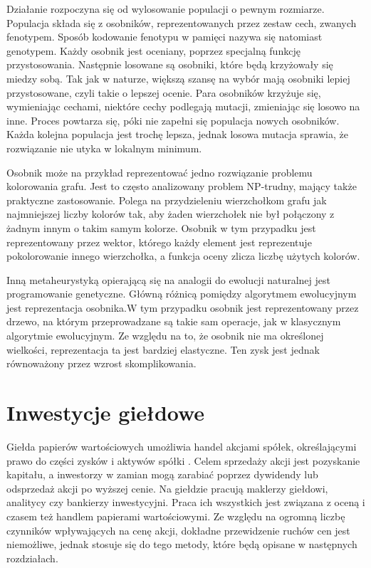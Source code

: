 \documentclass[twoside]{iisthesis}
\begin{document}
Działanie rozpoczyna się od wylosowanie populacji o pewnym rozmiarze. Populacja składa się z osobników, reprezentowanych przez zestaw cech, zwanych fenotypem. Sposób kodowanie fenotypu w pamięci nazywa się natomiast genotypem. Każdy osobnik jest oceniany, poprzez specjalną funkcję przystosowania. Następnie losowane są osobniki, które będą krzyżowały się miedzy sobą. Tak jak w naturze, większą szansę na wybór mają osobniki lepiej przystosowane, czyli takie o lepszej ocenie. Para osobników krzyżuje się, wymieniając cechami, niektóre cechy podlegają mutacji, zmieniając się losowo na inne. Proces powtarza się, póki nie zapełni się populacja nowych osobników. Każda kolejna populacja jest trochę lepsza, jednak losowa mutacja sprawia, że rozwiązanie nie utyka w lokalnym minimum. 

Osobnik może na przykład reprezentować jedno rozwiązanie problemu kolorowania grafu. Jest to często analizowany problem NP-trudny, mający także praktyczne zastosowanie. Polega na przydzieleniu wierzchołkom grafu jak najmniejszej liczby kolorów tak, aby żaden wierzchołek nie był połączony z żadnym innym o takim samym kolorze. Osobnik w tym przypadku jest reprezentowany przez wektor, którego każdy element jest reprezentuje pokolorowanie innego wierzchołka, a funkcja oceny zlicza liczbę użytych kolorów. 

Inną metaheurystyką opierającą się na analogii do ewolucji naturalnej jest programowanie genetyczne. Główną różnicą pomiędzy algorytmem ewolucyjnym jest reprezentacja osobnika.W tym przypadku osobnik jest reprezentowany przez drzewo, na którym przeprowadzane są takie sam operacje, jak w klasycznym algorytmie ewolucyjnym. Ze względu na to, że osobnik nie ma określonej wielkości, reprezentacja ta jest bardziej elastyczne. Ten zysk jest jednak równoważony przez wzrost skomplikowania.

\section{Inwestycje giełdowe}

Giełda papierów wartościowych umożliwia handel akcjami spółek, określającymi prawo do części zysków i aktywów spółki \cite{stockMarketInvestopedia}. Celem sprzedaży akcji jest pozyskanie kapitału, a inwestorzy w zamian mogą zarabiać poprzez dywidendy lub odsprzedaż akcji po wyższej cenie. Na giełdzie pracują maklerzy giełdowi, analitycy czy bankierzy inwestycyjni. Praca ich wszystkich jest związana z oceną i czasem też handlem papierami wartościowymi. Ze względu na ogromną liczbę czynników wpływających na cenę akcji, dokładne przewidzenie ruchów cen jest niemożliwe, jednak stosuje się do tego metody, które będą opisane w następnych rozdziałach. 
\end{document}
